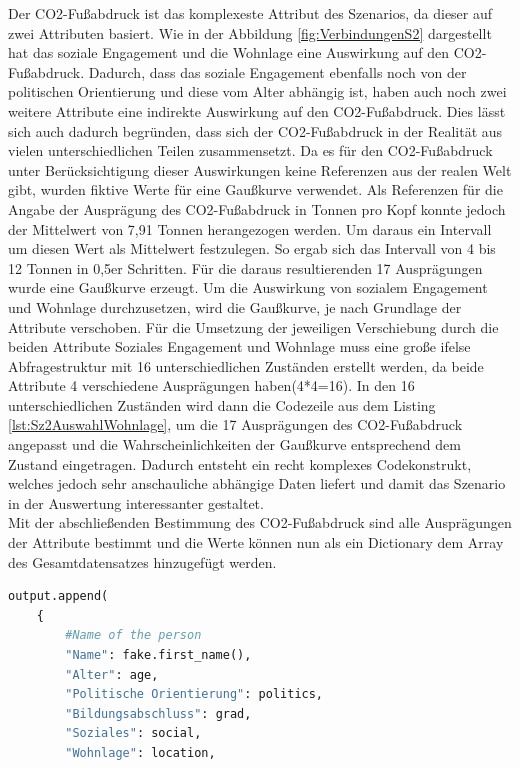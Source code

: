 \begin{onehalfspace}
Der CO2-Fußabdruck ist das komplexeste Attribut des Szenarios, da dieser auf zwei Attributen basiert. Wie in der Abbildung \ref{fig:VerbindungenS2} dargestellt hat das soziale Engagement und die Wohnlage eine Auswirkung auf den CO2-Fußabdruck. Dadurch, dass das soziale Engagement ebenfalls noch von der politischen Orientierung und diese vom Alter abhängig ist, haben auch noch zwei weitere Attribute eine indirekte Auswirkung auf den CO2-Fußabdruck. Dies lässt sich auch dadurch begründen, dass sich der CO2-Fußabdruck in der Realität aus vielen unterschiedlichen Teilen zusammensetzt. Da es für den CO2-Fußabdruck unter Berücksichtigung dieser Auswirkungen keine Referenzen aus der realen Welt gibt, wurden fiktive Werte für eine Gaußkurve verwendet. Als Referenzen für die Angabe der Ausprägung des CO2-Fußabdruck in Tonnen pro Kopf konnte jedoch der Mittelwert von 7,91 Tonnen herangezogen werden.\cite{ClimateWatch2022} Um daraus ein Intervall um diesen Wert als Mittelwert festzulegen. So ergab sich das Intervall von 4 bis 12 Tonnen in 0,5er Schritten. Für die daraus resultierenden 17 Ausprägungen wurde eine Gaußkurve erzeugt. Um die Auswirkung von sozialem Engagement und Wohnlage durchzusetzen, wird die Gaußkurve, je nach Grundlage der Attribute verschoben. Für die Umsetzung der jeweiligen Verschiebung durch die beiden Attribute Soziales Engagement und Wohnlage muss eine große ifelse Abfragestruktur mit 16 unterschiedlichen Zuständen erstellt werden, da beide Attribute 4 verschiedene Ausprägungen haben(4*4=16). In den 16 unterschiedlichen Zuständen wird dann die Codezeile aus dem Listing \ref{lst:Sz2AuswahlWohnlage}, um die 17 Ausprägungen des CO2-Fußabdruck angepasst und die Wahrscheinlichkeiten der Gaußkurve entsprechend dem Zustand eingetragen. Dadurch entsteht ein recht komplexes Codekonstrukt, welches jedoch sehr anschauliche abhängige Daten liefert und damit das Szenario in der Auswertung interessanter gestaltet.\\
Mit der abschließenden Bestimmung des CO2-Fußabdruck sind alle Ausprägungen der Attribute bestimmt und die Werte können nun als ein Dictionary dem Array des Gesamtdatensatzes hinzugefügt werden.
\begin{lstlisting}[language=Python,label={lst:Sz2AddEntry},caption=Codeausschnitt zum Hinzufügen eines Dateneintrags zum gesamt Datenset]
output.append(
    {
        #Name of the person
        "Name": fake.first_name(),
        "Alter": age,
        "Politische Orientierung": politics,
        "Bildungsabschluss": grad,
        "Soziales": social,
        "Wohnlage": location,

\end{lstlisting}
\end{onehalfspace}
